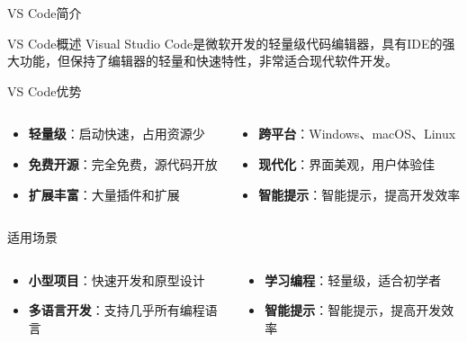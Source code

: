 \documentclass[UTF8,aspectratio=169]{beamer}
\begin{document}
\begin{frame}{VS Code简介}
    \begin{ytublock}{VS Code概述}
        Visual Studio Code是微软开发的轻量级代码编辑器，具有IDE的强大功能，但保持了编辑器的轻量和快速特性，非常适合现代软件开发。
    \end{ytublock}

    \begin{ytublock}{VS Code优势}
        \begin{columns}
            \begin{column}{0.48\textwidth}
                \begin{itemize}
                    \item \textbf{轻量级}：启动快速，占用资源少
                    \item \textbf{免费开源}：完全免费，源代码开放
                    \item \textbf{扩展丰富}：大量插件和扩展
                \end{itemize}
            \end{column}
            \hspace{0.02\textwidth}
            \begin{column}{0.48\textwidth}
                \begin{itemize}
                    \item \textbf{跨平台}：Windows、macOS、Linux
                    \item \textbf{现代化}：界面美观，用户体验佳
                    \item \textbf{智能提示}：智能提示，提高开发效率
                \end{itemize}
            \end{column}
        \end{columns}
    \end{ytublock}

    \begin{ytublock}{适用场景}
        \begin{columns}
            \begin{column}{0.48\textwidth}
                \begin{itemize}
                    \item \textbf{小型项目}：快速开发和原型设计
                    \item \textbf{多语言开发}：支持几乎所有编程语言
                \end{itemize}
            \end{column}
            \hspace{0.02\textwidth}
            \begin{column}{0.48\textwidth}
                \begin{itemize}
                    \item \textbf{学习编程}：轻量级，适合初学者
                    \item \textbf{智能提示}：智能提示，提高开发效率
                \end{itemize}
            \end{column}
        \end{columns}
    \end{ytublock}
\end{frame}
\end{document}
